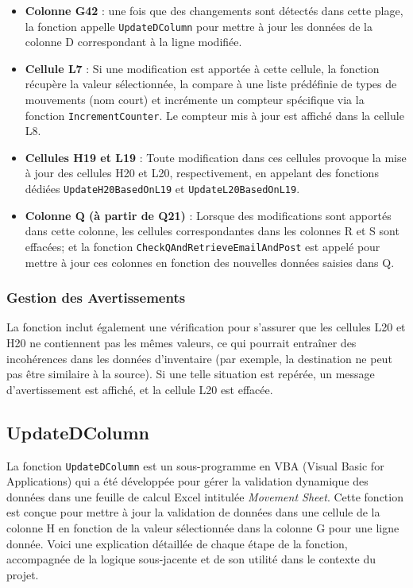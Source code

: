 \documentclass[a4paper, oneside, 12pt, final]{extreport}
\begin{document}
\begin{itemize}
    \item \textbf{Colonne G42} : une fois que des changements sont détectés dans cette plage, la fonction appelle \texttt{UpdateDColumn} pour mettre à jour les données de la colonne D correspondant à la ligne modifiée.
    
    \item \textbf{Cellule L7} : Si une modification est apportée à cette cellule, la fonction récupère la valeur sélectionnée, la compare à une liste prédéfinie de types de mouvements (nom court) et incrémente un compteur spécifique via la fonction \texttt{IncrementCounter}. Le compteur mis à jour est affiché dans la cellule L8.
    
    \item \textbf{Cellules H19 et L19} : Toute modification dans ces cellules provoque la mise à jour des cellules H20 et L20, respectivement, en appelant des fonctions dédiées \texttt{UpdateH20BasedOnL19} et \texttt{UpdateL20BasedOnL19}.
    
    \item \textbf{Colonne Q (à partir de Q21)} : Lorsque des modifications sont apportés dans cette colonne, les cellules correspondantes dans les colonnes R et S sont effacées; et la fonction \texttt{CheckQAndRetrieveEmailAndPost} est appelé pour mettre à jour ces colonnes en fonction des nouvelles données saisies dans Q.
\end{itemize}

\subsubsection{Gestion des Avertissements}
La fonction inclut également une vérification pour s'assurer que les cellules L20 et H20 ne contiennent pas les mêmes valeurs, ce qui pourrait entraîner des incohérences dans les données d'inventaire (par exemple, la destination ne peut pas être similaire à la source). Si une telle situation est repérée, un message d'avertissement est affiché, et la cellule L20 est effacée.


\subsection{UpdateDColumn}
La fonction \texttt{UpdateDColumn} est un sous-programme en VBA (Visual Basic for Applications) qui a été développée pour gérer la validation dynamique des données dans une feuille de calcul Excel intitulée \textit{Movement Sheet}. Cette fonction est conçue pour mettre à jour la validation de données dans une cellule de la colonne H en fonction de la valeur sélectionnée dans la colonne G pour une ligne donnée. Voici une explication détaillée de chaque étape de la fonction, accompagnée de la logique sous-jacente et de son utilité dans le contexte du projet.
\end{document}
